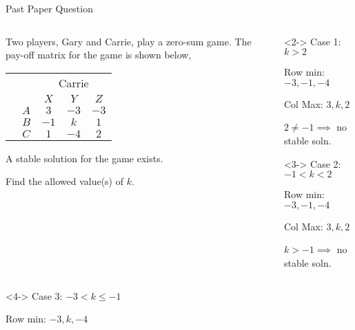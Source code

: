 \documentclass[8pt]{beamer}
\begin{document}
\begin{frame}[shrink=13]{Past Paper Question}
	\begin{columns}[T]
		\begin{column}{.5\textwidth}
	\begin{problem}
		Two players, Gary and Carrie, play a zero-sum game. The pay-off matrix for the game is shown below,


		\begin{center}
\colorbox{cc}{
	\setlength\arrayrulewidth{0.5mm}
\begin{tabular}{cc|ccc}
	\multicolumn{2}{c}{} & \multicolumn{3}{c}{Carrie}\\
\multicolumn{1}{c}{} &  & $X$  & $Y$ & $Z$ \\ \hline
\raisebox{0.0cm}{\multirow{3}*{\rotatebox{90}{Gary}}}  & $A$ & $3$ & $-3$ & $-3$ \\
& $B$ & $-1$ & $k$ & $1$ \\
& $C$ & $1$ & $-4$ & $2$ \\
\end{tabular}}
\end{center}

A stable solution for the game exists.

Find the allowed value(s) of $k$.
	\end{problem}
\end{column}
		\begin{column}{.5\linewidth}
			\begin{solution}<2->
		Case 1: $ k>2$

		Row min:  $-3,-1,-4$ 

Col Max: $3,k,2$

 $2\neq -1 \implies$ no stable soln. 
 \end{solution}
 \begin{solution}<3->
 Case 2: $-1<k<2$

 Row min:  $ -3,-1,-4$

 Col Max:  $3,k,2$ 

  $k>-1\implies$ no stable soln.
  \end{solution}
		\end{column}
	\end{columns}
		\begin{columns}[T]
		\begin{column}{.5\linewidth}
			\begin{solution}<4->
Case 3: $-3<k\leq -1$

Row min:  $-3,k,-4$


\end{solution}
\end{column}
\end{columns}
\end{frame}
\end{document}

